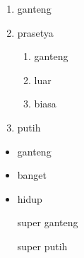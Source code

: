 \documentclass[12pt]{article}
\begin{document}
	\begin{enumerate}
		\item ganteng
		\item prasetya
			\begin{enumerate}
				\item ganteng
				\item luar
				\item biasa
			\end{enumerate}
		\item putih
	\end{enumerate}
	
	\begin{itemize}
		\item ganteng
		\item banget
		\item hidup
	\end{itemize}
	
	\begin{enumerate}
		\item[super] ganteng
		\item[super] putih
	\end{enumerate}
\end{document}
